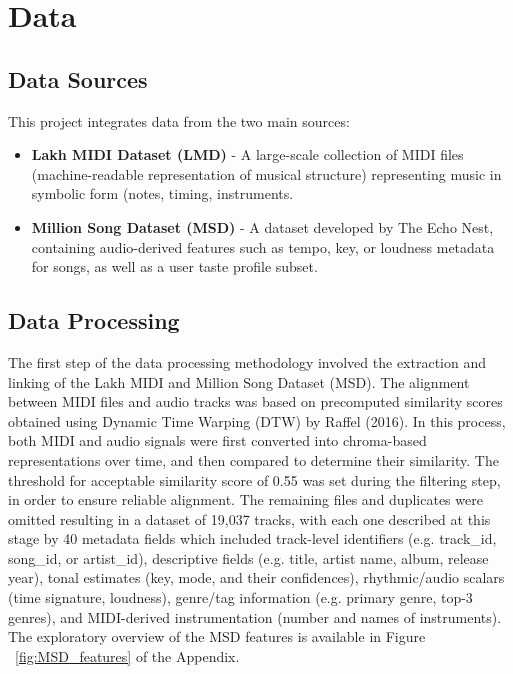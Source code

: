 \section{Data}
\label{sec:formatting}

\subsection{Data Sources}

This project integrates data from the two main sources:
\begin{itemize}

  \item \textbf{Lakh MIDI Dataset (LMD)}\cite{raffel2016lakh} - A large-scale collection of MIDI files (machine-readable representation of musical structure) representing music in symbolic form (notes, timing, instruments.
  \item \textbf{Million Song Dataset (MSD)}\cite{msd2011}\cite{echonest2011} - A dataset developed by The Echo Nest, containing audio-derived features such as tempo, key, or loudness metadata for songs, as well as a user taste profile subset.
\end{itemize}

\subsection{Data Processing}
The first step of the data processing methodology involved the extraction and linking of the Lakh MIDI and Million Song Dataset (MSD). The alignment between MIDI files and audio tracks was based on precomputed similarity scores obtained using Dynamic Time Warping (DTW) by Raffel (2016). In this process, both MIDI and audio signals were first converted into chroma-based representations over time, and then compared to determine their similarity. The threshold for acceptable similarity score of 0.55 was set during the filtering step, in order to ensure reliable alignment. The remaining files and duplicates were omitted resulting in a dataset of 19,037 tracks, with each one described at this stage by 40 metadata fields which included track-level identifiers (e.g. track\_id, song\_id, or artist\_id), descriptive fields (e.g. title, artist name, album, release year), tonal estimates (key, mode, and their confidences), rhythmic/audio scalars (time signature, loudness), genre/tag information (e.g. primary genre, top-3 genres), and MIDI-derived instrumentation (number and names of instruments). The exploratory overview of the MSD features is available in Figure ~\ref{fig:MSD_features} of the Appendix.

